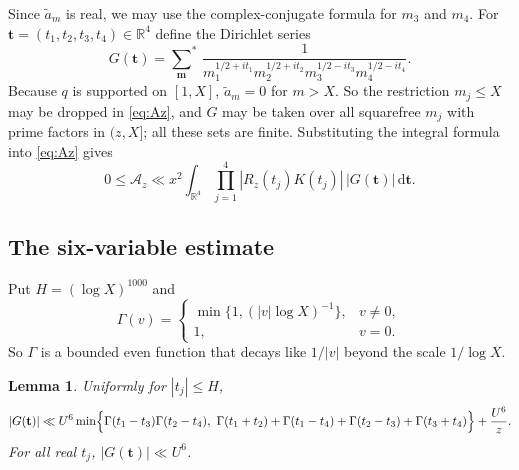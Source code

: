 \documentclass[11pt]{amsart}
\newtheorem{lemma}[theorem]{Lemma}
\theoremstyle{remark}
\numberwithin{equation}{section}
\newcommand{\R}{\mathbb{R}}
\newcommand{\dd}{\,\mathrm{d}}
\newcommand{\ta}{\widetilde{a}}
\newcommand{\bm}{\mathbf{m}}
\newcommand{\bt}{\mathbf{t}}
\begin{document}
Since $\ta_m$ is real, we may use the complex-conjugate formula for $m_3$ and $m_4$. For $\bt=(t_1,t_2,t_3,t_4)\in\R^4$ define the Dirichlet series
\begin{equation}\label{eq:G}
G(\bt)={\sum_{\bm}}^{*}\,\frac{1}{m_1^{1/2+it_1}m_2^{1/2+it_2}m_3^{1/2-it_3}m_4^{1/2-it_4}} .
\end{equation}
Because $q$ is supported on $[1,X]$, $\ta_m=0$ for $m>X$. So the restriction $m_j\le X$ may be dropped in \eqref{eq:Az}, and $G$ may be taken over all squarefree $m_j$ with prime factors in $(z,X]$; all these sets are finite. Substituting the integral formula into \eqref{eq:Az} gives
\begin{equation}\label{eq:Azbound}
0\le\mathcal A_z\ll x^2\int_{\R^4}\prod_{j=1}^4|R_z(t_j)K(t_j)|\,|G(\bt)|\dd\bt .
\end{equation}

\subsection{The six-variable estimate}
Put $H=(\log X)^{1000}$ and
\[
\Gamma(v)=\begin{cases}\min\{1,(|v|\log X)^{-1}\},&v\ne0,\\1,&v=0.\end{cases}
\]
So $\Gamma$ is a bounded even function that decays like $1/|v|$ beyond the scale $1/\log X$.

\begin{lemma}\label{lem:six}
Uniformly for $|t_j|\le H$,
\begin{equation}\label{eq:six}
|G(\bt)|\ll U^6\min\Bigl\{\Gamma(t_1-t_3)\Gamma(t_2-t_4),\ \Gamma(t_1+t_2)+\Gamma(t_1-t_4)+\Gamma(t_2-t_3)+\Gamma(t_3+t_4)\Bigr\}+\frac{U^6}{z}.
\end{equation}
For all real $t_j$, $|G(\bt)|\ll U^6$.
\end{lemma}
\end{document}
